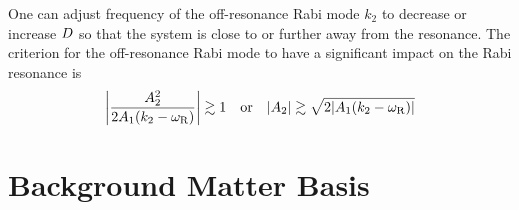 One can adjust frequency of the off-resonance Rabi mode $k_2$ to decrease or increase $D$ so that the system is close to or further away from the resonance. The criterion for the off-resonance Rabi mode to have a significant impact on the Rabi resonance is
\begin{equation}
    \left\lvert  \frac{ A_2^2 }{2  A_1 ( k_2 - \omega_{\mathrm R})} \right\rvert \gtrsim 1 \quad \text{or} \quad \lvert A_2\rvert \gtrsim \sqrt{ 2 \lvert A_1 (k_2 - \omega_\RR) \rvert }
    \label{chap:matter-sec:single-frequency-eqn:criterion-for-a2}
\end{equation}




\section{\label{chap:matter-sec:background}Background Matter Basis}



